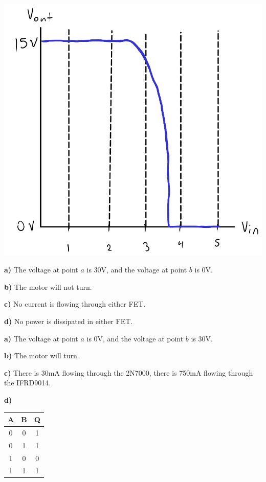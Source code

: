 \documentclass{article}
\begin{document}
    \begin{center}\includegraphics[scale=.5]{5.png}\end{center}

\newpage{}

    \textbf{a)} The voltage at point $a$ is 30V, and the voltage at point $b$ is 0V.
    
    \textbf{b)} The motor will not turn.
    
    \textbf{c)} No current is flowing through either FET.
    
    \textbf{d)} No power is dissipated in either FET.

\newpage{}

    \textbf{a)} The voltage at point $a$ is 0V, and the voltage at point $b$ is 30V.
    
    \textbf{b)} The motor will turn.

    \textbf{c)} There is 30mA flowing through the 2N7000, there is 750mA flowing through the IFRD9014.
    
    \textbf{d)} 

\newpage{}

\begin{center}\begin{tabular}{| c | c | c |}
    \hline
    A & B & Q \\
    \hline
    0 & 0 & 1 \\
    0 & 1 & 1 \\
    1 & 0 & 0 \\
    1 & 1 & 1 \\
    \hline
\end{tabular}\end{center}
\end{document}

